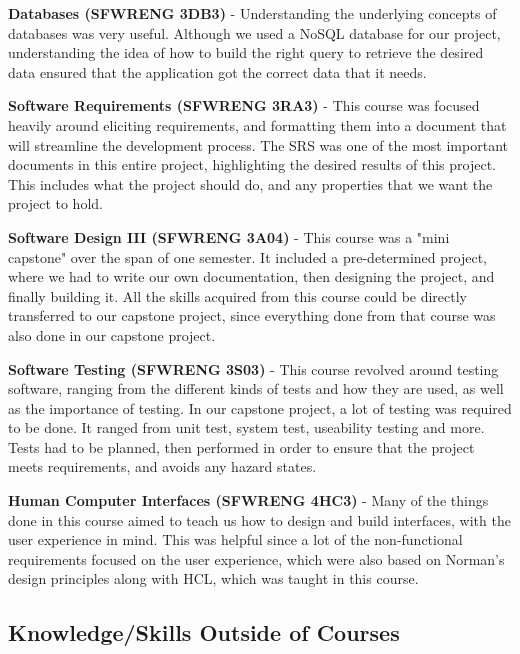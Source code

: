 \documentclass{article}
\begin{document}
\textbf{Databases (SFWRENG 3DB3)} - Understanding the underlying concepts of databases
was very useful. Although we used a NoSQL database for our project,
understanding the idea of how to build the right query to retrieve the desired
data ensured that the application got the correct data that it needs.

\textbf{Software Requirements (SFWRENG 3RA3)} - This course was focused heavily around
eliciting requirements, and formatting them into a document that will streamline
the development process. The SRS was one of the most important documents in this
entire project, highlighting the desired results of this project. This includes
what the project should do, and any properties that we want the project to hold. 

\textbf{Software Design III (SFWRENG 3A04)} - This course was a "mini capstone" over the
span of one semester. It included a pre-determined project, where we had to
write our own documentation, then designing the project, and finally building
it. All the skills acquired from this course could be directly transferred to
our capstone project, since everything done from that course was also done in
our capstone project. 

\textbf{Software Testing (SFWRENG 3S03)} - This course revolved around testing software,
ranging from the different kinds of tests and how they are used, as well as the
importance of testing. In our capstone project, a lot of testing was required to
be done. It ranged from unit test, system test, useability testing and more.
Tests had to be planned, then performed in order to ensure that the project
meets requirements, and avoids any hazard states.

\textbf{Human Computer Interfaces (SFWRENG 4HC3)} - Many of the things done in this
course aimed to teach us how to design and build interfaces, with the user
experience in mind. This was helpful since a lot of the non-functional
requirements focused on the user experience, which were also based on Norman's
design principles along with HCL, which was taught in this course.
\subsection{Knowledge/Skills Outside of Courses}
\end{document}
